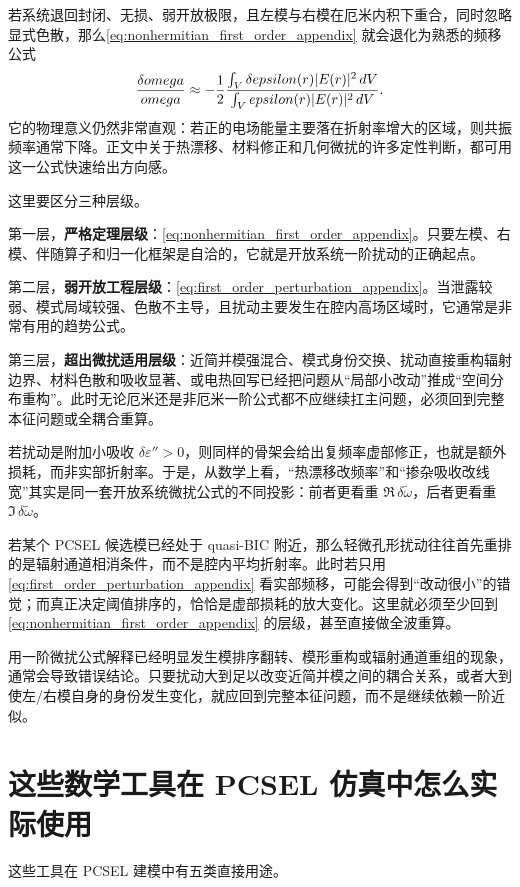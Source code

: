 若系统退回封闭、无损、弱开放极限，且左模与右模在厄米内积下重合，同时忽略显式色散，那么\cref{eq:nonhermitian_first_order_appendix} 就会退化为熟悉的频移公式
\begin{equation}
\frac{\delta omega}{omega}
\approx
-
\frac{1}{2}
\frac{\int_V \delta epsilon(r) |E(r)|^2\,d V}
{\int_V epsilon(r)|E(r)|^2\,d V}.
\label{eq:first_order_perturbation_appendix}
\end{equation}
它的物理意义仍然非常直观：若正的电场能量主要落在折射率增大的区域，则共振频率通常下降。正文中关于热漂移、材料修正和几何微扰的许多定性判断，都可用这一公式快速给出方向感。

这里要区分三种层级。

第一层，\textbf{严格定理层级}：\cref{eq:nonhermitian_first_order_appendix}。只要左模、右模、伴随算子和归一化框架是自洽的，它就是开放系统一阶扰动的正确起点。  

第二层，\textbf{弱开放工程层级}：\cref{eq:first_order_perturbation_appendix}。当泄露较弱、模式局域较强、色散不主导，且扰动主要发生在腔内高场区域时，它通常是非常有用的趋势公式。  

第三层，\textbf{超出微扰适用层级}：近简并模强混合、模式身份交换、扰动直接重构辐射边界、材料色散和吸收显著、或电热回写已经把问题从“局部小改动”推成“空间分布重构”。此时无论厄米还是非厄米一阶公式都不应继续扛主问题，必须回到完整本征问题或全耦合重算。

若扰动是附加小吸收 $\delta\varepsilon''>0$，则同样的骨架会给出复频率虚部修正，也就是额外损耗，而非实部折射率。于是，从数学上看，“热漂移改频率”和“掺杂吸收改线宽”其实是同一套开放系统微扰公式的不同投影：前者更看重 $\Re\,\delta\tilde{\omega}$，后者更看重 $\Im\,\delta\tilde{\omega}$。

若某个 PCSEL 候选模已经处于 quasi-BIC 附近，那么轻微孔形扰动往往首先重排的是辐射通道相消条件，而不是腔内平均折射率。此时若只用\cref{eq:first_order_perturbation_appendix} 看实部频移，可能会得到“改动很小”的错觉；而真正决定阈值排序的，恰恰是虚部损耗的放大变化。这里就必须至少回到\cref{eq:nonhermitian_first_order_appendix} 的层级，甚至直接做全波重算。

\begin{PitfallBox}
用一阶微扰公式解释已经明显发生模排序翻转、模形重构或辐射通道重组的现象，通常会导致错误结论。只要扰动大到足以改变近简并模之间的耦合关系，或者大到使左/右模自身的身份发生变化，就应回到完整本征问题，而不是继续依赖一阶近似。
\end{PitfallBox}

\section{这些数学工具在 PCSEL 仿真中怎么实际使用}
这些工具在 PCSEL 建模中有五类直接用途。


